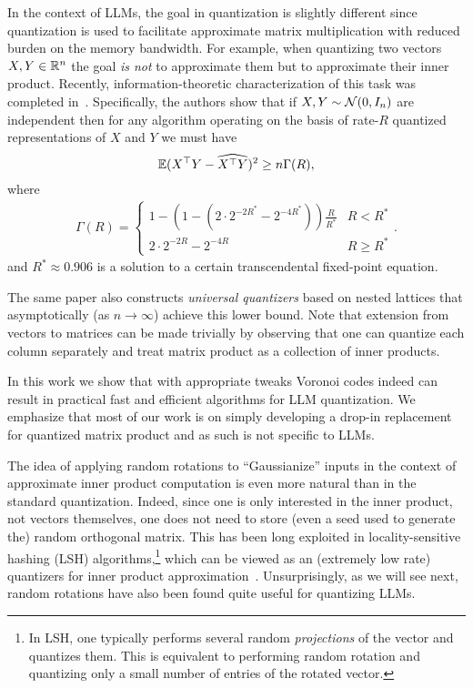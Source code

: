 In the context of LLMs, the goal in quantization is slightly different since quantization is used to facilitate approximate matrix multiplication with reduced burden on the memory bandwidth. For example, when quantizing two vectors  $X,Y\in\mathbb{R}^n$ the goal \emph{is not} to approximate them but to approximate their inner product. Recently, information-theoretic characterization of this task was completed in~\citep{op2024}. Specifically, the authors show that if $X,Y\sim\mathcal{N}(0,I_n)$ are independent then for any algorithm operating on the basis of rate-$R$ quantized representations of $X$ and $Y$ we must have 
\begin{equation}\label{eq:lbnd}
\mathbb{E}(X^\top Y-\widehat{X^\top Y})^2\geq n\Gamma(R),    
\end{equation}
where
\begin{align}
\Gamma(R)=    \begin{cases}
1-\left(1-(2\cdot2^{-2R^*}-2^{-4R^*})\right)\frac{R}{R^*}   & R<R^* \\
2\cdot 2^{-2R}-2^{-4R}    & R\geq R^*
\end{cases}.
\label{eq:gammadef}
\end{align}
and $R^*\approx 0.906$ is a solution to a certain transcendental fixed-point equation.

The same paper also constructs \textit{universal quantizers} based on nested lattices that asymptotically (as $n\to \infty$) achieve this lower bound. Note that extension from vectors to matrices can be made trivially by observing that one can quantize each column separately and treat matrix product as a collection of inner products.


In this work we show that with appropriate tweaks Voronoi codes indeed can result in practical fast and efficient algorithms for LLM quantization. We emphasize that most of our work is on simply developing a drop-in replacement for quantized matrix product and as such is not specific to LLMs.


The idea of applying random rotations to ``Gaussianize'' inputs in the context of approximate inner product computation is even  more natural than in the standard quantization. Indeed, since one is only interested in the inner product, not vectors themselves, one does not need to store (even a seed used to generate the) random orthogonal matrix. This has been long exploited in locality-sensitive hashing (LSH) algorithms,\footnote{In LSH, one typically performs several random \emph{projections} of the vector and quantizes them. This is equivalent to performing random rotation and quantizing only a small number of entries of the rotated vector.} which can be viewed as an (extremely low rate) quantizers for inner product approximation~\cite{charikar2002similarity,datar2004locality,andoni2008near}. Unsurprisingly, as we will see next,  random rotations have also been found quite useful for quantizing LLMs.


